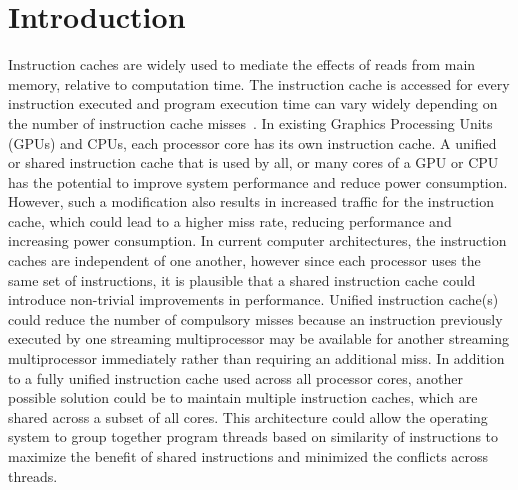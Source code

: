 \section{Introduction}


Instruction caches are widely used to mediate the effects of reads
from main memory, relative to computation time. 
The instruction cache is accessed for every instruction executed and
program execution time can vary widely depending on the number of
instruction cache misses~\cite{arnold94}. 
In existing Graphics Processing Units (GPUs) and CPUs, each processor
core has its own instruction cache. 
A unified or shared instruction cache that is used by all, or many
cores of a GPU or CPU has the potential to improve system performance
and reduce power consumption.
However, such a modification also results in increased traffic for the
instruction cache, which could lead to a higher miss rate, reducing
performance and increasing power consumption. 
In current computer architectures, the instruction caches are
independent of one another, however since each processor uses the same
set of instructions, it is plausible that a shared instruction cache
could introduce non-trivial improvements in performance. 
Unified instruction cache(s) could reduce the number of compulsory
misses because an instruction previously executed by one streaming
multiprocessor may be available for another streaming multiprocessor
immediately rather than requiring an additional miss. 
In addition to a fully unified instruction cache used across all
processor cores, another possible solution could be to maintain
multiple instruction caches, which are shared across a subset of all
cores. 
This architecture could allow the operating system to group together
program threads based on similarity of instructions to maximize the
benefit of shared instructions and minimized the conflicts across
threads. 

